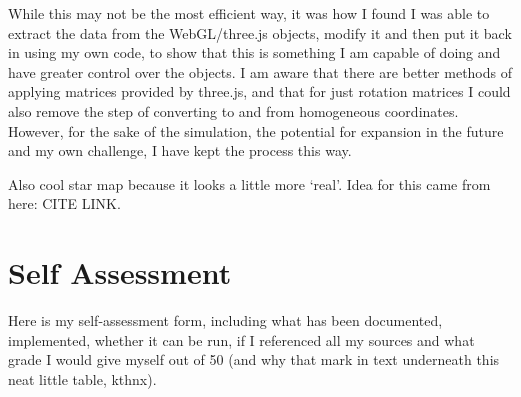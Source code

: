 \documentclass[12pt]{article}
\begin{document}
While this may not be the most efficient way, it was how I found I was able to extract the data from the WebGL/three.js objects, modify it and then put it back in using my own code, to show that this is something I am capable of doing and have greater control over the objects. I am aware that there are better methods of applying matrices provided by three.js, and that for just rotation matrices I could also remove the step of converting to and from homogeneous coordinates. However, for the sake of the simulation, the potential for expansion in the future and my own challenge, I have kept the process this way.

 Also cool star map because it looks a little more `real'. Idea for this came from here: CITE LINK.




\clearpage

\section{Self Assessment}
Here is my self-assessment form, including what has been documented, implemented, whether it can be run, if I referenced all my sources and what grade I would give myself out of 50 (and why that mark in text underneath this neat little table, kthnx).
\end{document}
